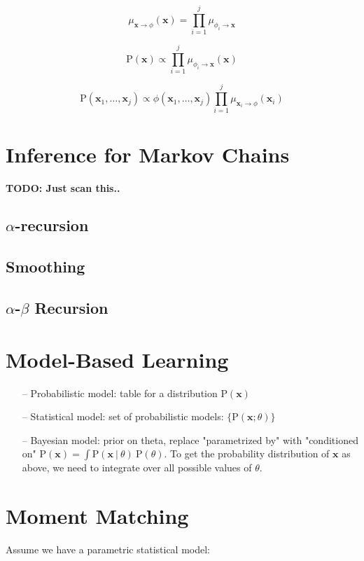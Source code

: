 \documentclass{article}
\newcommand{\prob}{\text{P}}
\renewcommand{\vec}[1]{\mathbf{#1}}
\newcommand{\bx}{\vec{x}}
\newcommand{\giv}{\ |\ }
\begin{document}
\begin{equation*}
    \mu_{\bx \to \phi}(\bx) = \prod_{i = 1} ^ {j} \mu_{\phi_i \to \bx}
\end{equation*}

\begin{equation*}
    \prob(\bx) \propto \prod_{i = 1}^j \mu_{\phi_i \to \bx}(\bx)
\end{equation*}

\begin{equation*}
    \prob(\bx_1, \dots, \bx_j) \propto \phi(\bx_1, \dots, \bx_j)
        \prod_{i = 1}^{j} \mu_{\bx_i \to \phi} (\bx_i)
\end{equation*}

\section{Inference for Markov Chains}
\textbf{TODO: Just scan this..}
\subsection{$\alpha$-recursion}
\subsection{Smoothing}
\subsection{$\alpha$-$\beta$ Recursion}

\section{Model-Based Learning}
\begin{itemize}
    \item[--] Probabilistic model: table for a distribution $\prob(\bx)$
    \item[--] Statistical model: set of probabilistic models: $\{ \prob(\bx; \theta) \}$
    \item[--] Bayesian model: prior on theta, replace "parametrized by" with "conditioned on"
        $\prob(\bx) = \int \prob(\bx \giv \theta)\ \prob(\theta)$. To get the probability distribution
        of $\bx$ as above, we need to integrate over all possible values of $\theta$.
\end{itemize}

\section{Moment Matching}
Assume we have a parametric statistical model:
\end{document}

